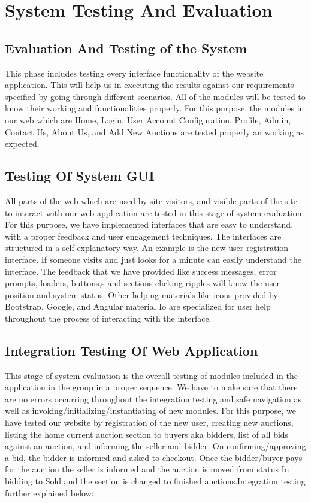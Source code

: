 \doublespacing
\chapter{System Testing And Evaluation}\label{chap:testingEvaluation}


\section{Evaluation And Testing of the System }
\doublespacing
This phase includes testing every interface functionality of the website application. This will help us in executing the results against our requirements specified by going through different scenarios. All of the modules will be tested to know their working and functionalities properly. For this purpose, the modules in our web which are Home, Login, User Account Configuration, Profile, Admin, Contact Us, About Us, and Add New Auctions are tested properly an working as expected.
\section{Testing Of System GUI}
\doublespacing
All parts of the web which are used by site visitors, and visible parts of the site to interact with our web application are tested in this stage of system evaluation. For this purpose, we have implemented interfaces that are easy to understand, with a proper feedback and user engagement techniques. The interfaces are structured in a self-explanatory way. An example is the new user registration interface. If someone visits and just looks for a minute can easily understand the interface. The feedback that we have provided like success messages, error prompts, loaders, buttons,s and sections clicking ripples will know the user position and system status. Other helping materials like icons provided by Bootstrap, Google, and Angular material Io are specialized for user help throughout the process of interacting with the interface.
\section{Integration Testing Of Web Application}
\doublespacing
This stage of system evaluation is the overall testing of modules included in the application in the group in a proper sequence. We have to make sure that there are no errors occurring throughout the integration testing and safe navigation as well as invoking/initializing/instantiating of new modules. For this purpose, we have tested our website by registration of the new user, creating new auctions, listing the home current auction section to buyers aka bidders, list of all bids against an auction, and informing the seller and bidder. On confirming/approving a bid, the bidder is informed and asked to checkout. Once the bidder/buyer pays for the auction the seller is informed and the auction is moved from status In bidding to Sold and the section is changed to finished auctions.Integration testing further explained below:
